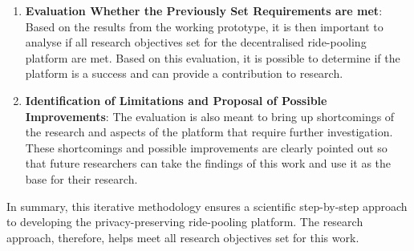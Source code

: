 \begin{enumerate}
    \item \textbf{Evaluation Whether the Previously Set Requirements are met}: 
    Based on the results from the working prototype, it is then important to analyse if all research objectives set for the decentralised ride-pooling platform are met. Based on this evaluation, it is possible to determine if the platform is a success and can provide a contribution to research.

    \item \textbf{Identification of Limitations and Proposal of Possible Improvements}:
    The evaluation is also meant to bring up shortcomings of the research and aspects of the platform that require further investigation. These shortcomings and possible improvements are clearly pointed out so that future researchers can take the findings of this work and use it as the base for their research.

\end{enumerate}

In summary, this iterative methodology ensures a scientific step-by-step approach to developing the  privacy-preserving ride-pooling platform. The research approach, therefore, helps meet all research objectives set for this work.